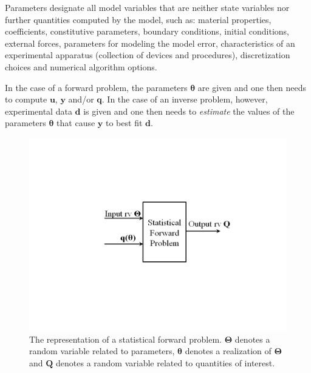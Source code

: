 Parameters designate all model variables that are neither state variables
nor further quantities computed by the model, such as: material properties, coefficients, constitutive parameters, boundary conditions, initial conditions,
external forces, parameters for modeling the model error, characteristics of an experimental apparatus (collection of devices and procedures),
discretization choices and numerical algorithm options.



In the case of a forward problem, the parameters $\boldsymbol{\theta}$ are given and
one then needs to compute $\mathbf{u}$, $\mathbf{y}$ and/or $\mathbf{q}$.
In the case of an inverse problem, however, experimental data $\mathbf{d}$ is given and
one then needs to {\it estimate} the values of the parameters $\boldsymbol{\theta}$ that
cause $\mathbf{y}$ to best fit  $\mathbf{d}$.


\begin{figure}[h!]
\centerline{
\includegraphics[scale=0.45,clip=true,viewport=1.0in 2.5in 10.0in 5.5in]{figs/queso_paper1_09}
}
\caption{
The representation of a statistical forward problem.
$\boldsymbol{\Theta}$ denotes a random variable related to parameters,
$\boldsymbol{\theta}$ denotes a realization of $\boldsymbol{\Theta}$ and
$\mathbf{Q}$ denotes a random variable related to quantities of interest.
}
\label{fig-sfp-queso}
\end{figure}

